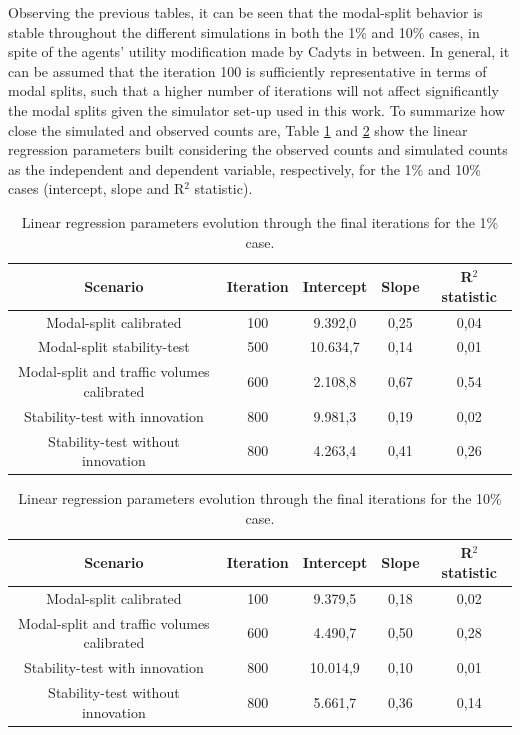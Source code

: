 \documentclass[Journal,letterpaper]{ascelike-new}
\begin{document}
Observing the previous tables, it can be seen that the modal-split behavior is stable throughout the different simulations in both the 1\% and 10\% cases, in spite of the agents' utility modification made by Cadyts in between. In general, it can be assumed that the iteration 100 is sufficiently representative in terms of modal splits, such that a higher number of iterations will not affect significantly the modal splits given the simulator set-up used in this work. %
To summarize how close the simulated and observed counts are, Table \ref{table:1pct_fitEvolution} and \ref{table:10pct_fitEvolution} show the linear regression parameters built considering the observed counts and simulated counts as the independent and dependent variable, respectively, for the 1\% and 10\% cases (intercept, slope and R$^2$ statistic).

\begin{table}
	\caption{Linear regression parameters evolution through the final iterations for the 1\% case.}
	\label{table:1pct_fitEvolution}
	\begin{tabular}{ccccc}
		\hline	
		Scenario & Iteration & Intercept &  Slope & R$^{2}$ statistic \\
		\hline
		Modal-split calibrated						& 100 & 9.392,0  & 0,25 & 0,04 \\
		Modal-split stability-test					& 500 & 10.634,7 & 0,14 & 0,01 \\
		Modal-split and traffic volumes calibrated	& 600 & 2.108,8  & 0,67 & 0,54 \\
		Stability-test with innovation				& 800 & 9.981,3  & 0,19 & 0,02 \\
		Stability-test without innovation			& 800 & 4.263,4  & 0,41 & 0,26 \\
		\hline
	\end{tabular}
\end{table}

\begin{table}
	\caption{Linear regression parameters evolution through the final iterations for the 10\% case.}
	\label{table:10pct_fitEvolution}
	\begin{tabular}{ccccc}
		\hline	
		Scenario & Iteration & Intercept &  Slope & R$^{2}$ statistic \\
		\hline
		Modal-split calibrated						& 100 & 9.379,5  & 0,18 & 0,02 \\
		Modal-split and traffic volumes calibrated	& 600 & 4.490,7  & 0,50 & 0,28 \\
		Stability-test with innovation				& 800 & 10.014,9 & 0,10 & 0,01 \\
		Stability-test without innovation			& 800 & 5.661,7  & 0,36 & 0,14 \\
		\hline
	\end{tabular}
\end{table}
\end{document}
